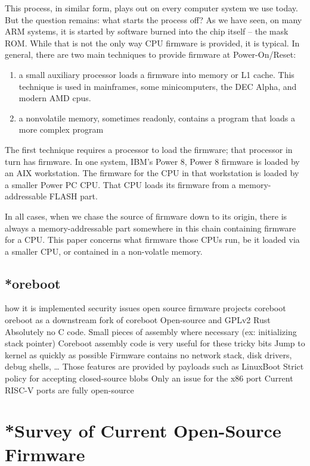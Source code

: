 \documentclass[conference]{IEEEtran}
\begin{document}
This process, in similar form, plays out on every computer system we use today. But the question remains: what starts the process off? As we have seen, on many ARM systems, it is started by software burned into the chip itself -- the mask ROM. 
While that is not the only way CPU firmware is provided, it is typical. 
In general, there are two main techniques to provide firmware at Power-On/Reset:
\begin{enumerate}
    \item a small auxiliary processor loads a firmware into memory or L1 cache. This technique is used in mainframes, some minicomputers, the DEC Alpha, and modern AMD cpus. 
\item a nonvolatile memory, sometimes readonly, contains a program that loads a more complex program
\end{enumerate}
The first technique requires a processor to load the firmware; that processor in turn has firmware. In one system, IBM's Power 8, Power 8 firmware is loaded by an AIX workstation. The firmware for the CPU in that workstation is loaded by a smaller Power PC CPU. That CPU loads its firmware from a memory-addressable FLASH part. 

In all cases, when we chase the source of firmware down to its origin, there is always a memory-addressable part somewhere in this chain containing firmware for a CPU.
This paper concerns what firmware those CPUs run, be it loaded via a smaller CPU, or contained in a non-volatle memory. 

\subsection{*oreboot}

how it is implemented 
security issues 
open source firmware projects
coreboot
oreboot as a downstream fork of coreboot\cite{minnich2000linux}
Open-source and GPLv2
Rust
Absolutely no C code.
Small pieces of assembly where necessary (ex: initializing stack pointer)
Coreboot assembly code is very useful for these tricky bits
Jump to kernel as quickly as possible
Firmware contains no network stack, disk drivers, debug shells, …
Those features are provided by payloads such as LinuxBoot
Strict policy for accepting closed-source blobs
Only an issue for the x86 port
Current RISC-V ports are fully open-source


\section{*Survey of Current Open-Source Firmware}
\end{document}
